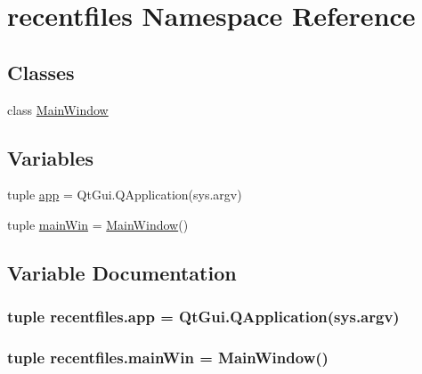 \hypertarget{namespacerecentfiles}{}\section{recentfiles Namespace Reference}
\label{namespacerecentfiles}
\subsection*{Classes}
\begin{DoxyCompactItemize}
\item 
class \hyperlink{classrecentfiles_1_1MainWindow}{Main\+Window}
\end{DoxyCompactItemize}
\subsection*{Variables}
\begin{DoxyCompactItemize}
\item 
tuple \hyperlink{namespacerecentfiles_a15a3b560fc7a63ef2b2cbfd8cb1c6c24}{app} = Qt\+Gui.\+Q\+Application(sys.\+argv)
\item 
tuple \hyperlink{namespacerecentfiles_a4078c47c50abed598e6fe87eec125ac8}{main\+Win} = \hyperlink{classrecentfiles_1_1MainWindow}{Main\+Window}()
\end{DoxyCompactItemize}


\subsection{Variable Documentation}
\hypertarget{namespacerecentfiles_a15a3b560fc7a63ef2b2cbfd8cb1c6c24}{}
\subsubsection[{app}]{\setlength{\rightskip}{0pt plus 5cm}tuple recentfiles.\+app = Qt\+Gui.\+Q\+Application(sys.\+argv)}\label{namespacerecentfiles_a15a3b560fc7a63ef2b2cbfd8cb1c6c24}
\hypertarget{namespacerecentfiles_a4078c47c50abed598e6fe87eec125ac8}{}
\subsubsection[{main\+Win}]{\setlength{\rightskip}{0pt plus 5cm}tuple recentfiles.\+main\+Win = {\bf Main\+Window}()}\label{namespacerecentfiles_a4078c47c50abed598e6fe87eec125ac8}
